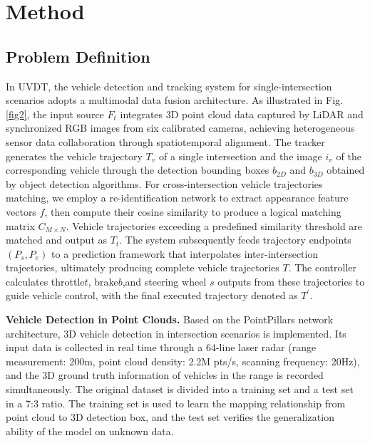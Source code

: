 \documentclass[journal,twoside,web]{ieeecolor}
\begin{document}
\section{Method}

\subsection{Problem Definition}

In UVDT, the vehicle detection and tracking system for single-intersection scenarios adopts a multimodal data fusion architecture.
As illustrated in Fig. \ref{fig2}, the input source \(F_{t}\) integrates 3D point cloud data captured by LiDAR and synchronized RGB images from six calibrated cameras, achieving heterogeneous sensor data collaboration through spatiotemporal alignment.
The tracker generates the vehicle trajectory \(T_{v}\) of a single intersection and the image \(i_{v}\) of the corresponding vehicle through the detection bounding boxes \(b_{2D}\) and \(b_{3D}\) obtained by object detection algorithms.
For cross-intersection vehicle trajectories matching, we employ a re-identification network to extract appearance feature vectors \(f\), then compute their cosine similarity to produce a logical matching matrix \(C_{M \times N}\).
Vehicle trajectories exceeding a predefined similarity threshold are matched and output as \(T_{t}\).
The system subsequently feeds trajectory endpoints \((P_{s},P_{e})\) to a prediction framework that interpolates inter-intersection trajectories, ultimately producing complete vehicle trajectories \(T\). 
The controller calculates throttle\(t\), brake\(b\),and steering wheel \(s\) outputs from these trajectories to guide vehicle control, with the final executed trajectory denoted as \(T^\prime\).

\textbf{Vehicle Detection in Point Clouds.}
Based on the PointPillars network architecture, 3D vehicle detection in intersection scenarios is implemented. Its input data is collected in real time through a 64-line laser radar (range measurement: 200m, point cloud density: 2.2M pts/s, scanning frequency: 20Hz), and the 3D ground truth information of vehicles in the range is recorded simultaneously. The original dataset is divided into a training set and a test set in a 7:3 ratio. The training set is used to learn the mapping relationship from point cloud to 3D detection box, and the test set verifies the generalization ability of the model on unknown data.
\end{document}
